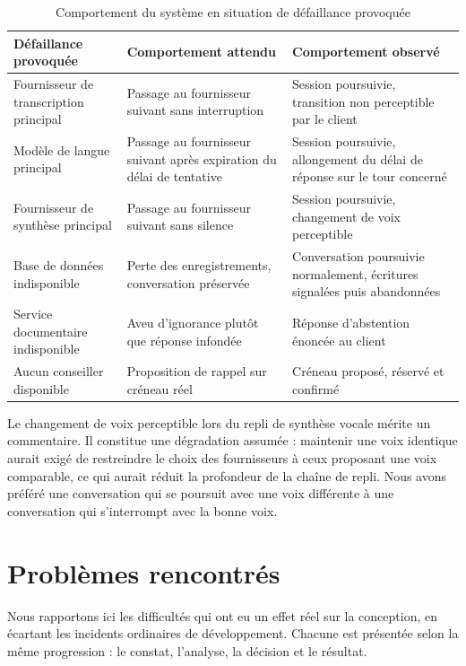 \begin{table}[H]
\centering
\renewcommand{\arraystretch}{1.25}
\begin{tabular}{|p{4.0cm}|p{5.2cm}|p{5.3cm}|}
\hline
\textbf{Défaillance provoquée} & \textbf{Comportement attendu} & \textbf{Comportement observé} \\
\hline
Fournisseur de transcription principal & Passage au fournisseur suivant sans interruption & Session poursuivie, transition non perceptible par le client \\
\hline
Modèle de langue principal & Passage au fournisseur suivant après expiration du délai de tentative & Session poursuivie, allongement du délai de réponse sur le tour concerné \\
\hline
Fournisseur de synthèse principal & Passage au fournisseur suivant sans silence & Session poursuivie, changement de voix perceptible \\
\hline
Base de données indisponible & Perte des enregistrements, conversation préservée & Conversation poursuivie normalement, écritures signalées puis abandonnées \\
\hline
Service documentaire indisponible & Aveu d'ignorance plutôt que réponse infondée & Réponse d'abstention énoncée au client \\
\hline
Aucun conseiller disponible & Proposition de rappel sur créneau réel & Créneau proposé, réservé et confirmé \\
\hline
\end{tabular}
\caption{Comportement du système en situation de défaillance provoquée}
\label{tab:resilience}
\end{table}

Le changement de voix perceptible lors du repli de synthèse vocale mérite un commentaire. Il constitue une dégradation assumée : maintenir une voix identique aurait exigé de restreindre le choix des fournisseurs à ceux proposant une voix comparable, ce qui aurait réduit la profondeur de la chaîne de repli. Nous avons préféré une conversation qui se poursuit avec une voix différente à une conversation qui s'interrompt avec la bonne voix.

\section{Problèmes rencontrés}

Nous rapportons ici les difficultés qui ont eu un effet réel sur la conception, en écartant les incidents ordinaires de développement. Chacune est présentée selon la même progression : le constat, l'analyse, la décision et le résultat.

